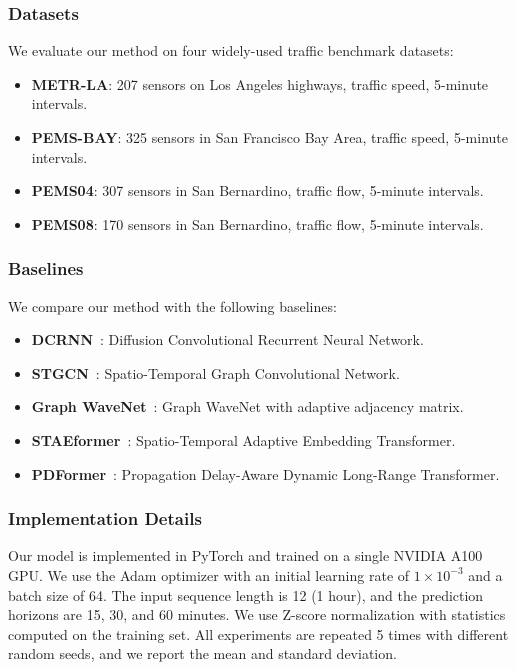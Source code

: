 \documentclass[journal,10pt]{IEEEtran}
\begin{document}
\subsubsection{Datasets}
We evaluate our method on four widely-used traffic benchmark datasets:
\begin{itemize}
    \item \textbf{METR-LA}: 207 sensors on Los Angeles highways,
    traffic speed, 5-minute intervals.
    \item \textbf{PEMS-BAY}: 325 sensors in San Francisco Bay Area,
    traffic speed, 5-minute intervals.
    \item \textbf{PEMS04}: 307 sensors in San Bernardino,
    traffic flow, 5-minute intervals.
    \item \textbf{PEMS08}: 170 sensors in San Bernardino,
    traffic flow, 5-minute intervals.
\end{itemize}

\subsubsection{Baselines}
We compare our method with the following baselines:
\begin{itemize}
    \item \textbf{DCRNN}~\cite{dcrnn}: Diffusion Convolutional Recurrent Neural Network.
    \item \textbf{STGCN}~\cite{stgcn}: Spatio-Temporal Graph Convolutional Network.
    \item \textbf{Graph WaveNet}~\cite{gwnet}: Graph WaveNet with adaptive adjacency matrix.
    \item \textbf{STAEformer}~\cite{staeformer}: Spatio-Temporal Adaptive Embedding Transformer.
    \item \textbf{PDFormer}~\cite{pdformer}: Propagation Delay-Aware Dynamic Long-Range Transformer.
\end{itemize}

\subsubsection{Implementation Details}
\label{sec:impl}

Our model is implemented in PyTorch and trained on a single NVIDIA A100 GPU.
We use the Adam optimizer with an initial learning rate of $1 \times 10^{-3}$
and a batch size of 64. The input sequence length is 12 (1 hour),
and the prediction horizons are 15, 30, and 60 minutes.
We use Z-score normalization with statistics computed on the training set.
All experiments are repeated 5 times with different random seeds,
and we report the mean and standard deviation.
\end{document}
